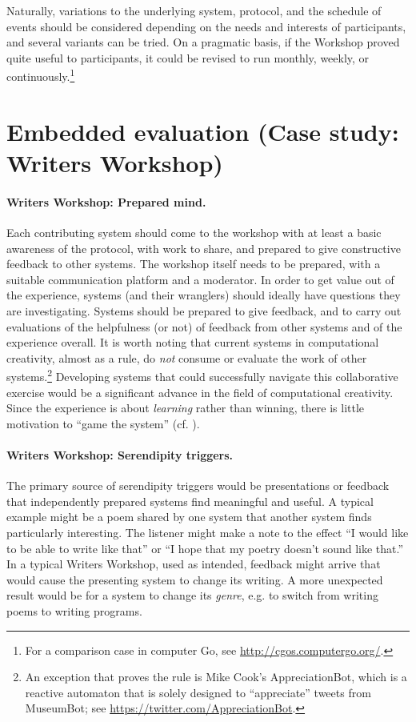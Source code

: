 \documentclass[letter]{article}
\begin{document}
Naturally, variations to the underlying system, protocol, and the
schedule of events should be considered depending on the needs and
interests of participants, and several variants can be tried.  On a
pragmatic basis, if the Workshop proved quite useful to participants,
it could be revised to run monthly, weekly, or
continuously.\footnote{For a comparison case in computer Go, see
  \url{http://cgos.computergo.org/}.}

\section{Embedded evaluation (Case study: Writers Workshop)}

\paragraph{Writers Workshop: Prepared mind.}
Each contributing system should come to the workshop with at least a
basic awareness of the protocol, with work to share, and prepared to
give constructive feedback to other systems.  The workshop itself
needs to be prepared, with a suitable communication platform and a
moderator.  In order to get value out of the experience, systems (and
their wranglers) should ideally have questions they are investigating.
Systems should be prepared to give feedback, and to carry out
evaluations of the helpfulness (or not) of feedback from other systems
and of the experience overall.  It is worth noting that current
systems in computational creativity, almost as a rule, do \emph{not}
consume or evaluate the work of other systems.\footnote{An exception
  that proves the rule is Mike Cook's {\sf AppreciationBot}, which is
   a reactive automaton that is solely designed to ``appreciate''
   tweets from {\sf MuseumBot}; see
  \url{https://twitter.com/AppreciationBot}.}  Developing systems that
could successfully navigate this collaborative exercise would be a
significant advance in the field of computational creativity.  Since
the experience is about \emph{learning} rather than winning, there is
little motivation to ``game the system''
(cf. \cite{lenat1983eurisko}).

\paragraph{Writers Workshop: Serendipity triggers.}

The primary source of serendipity triggers would be presentations or
feedback that independently prepared systems find meaningful and
useful.  A typical example might be a poem shared by one system that
another system finds particularly interesting.  The listener might
make a note to the effect ``I would like to be able to write like
that'' or ``I hope that my poetry doesn't sound like that.''  In a
typical Writers Workshop, used as intended, feedback might arrive that
would cause the presenting system to change its writing.  A more
unexpected result would be for a system to change its \emph{genre},
e.g. to switch from writing poems to writing programs.
\end{document}
